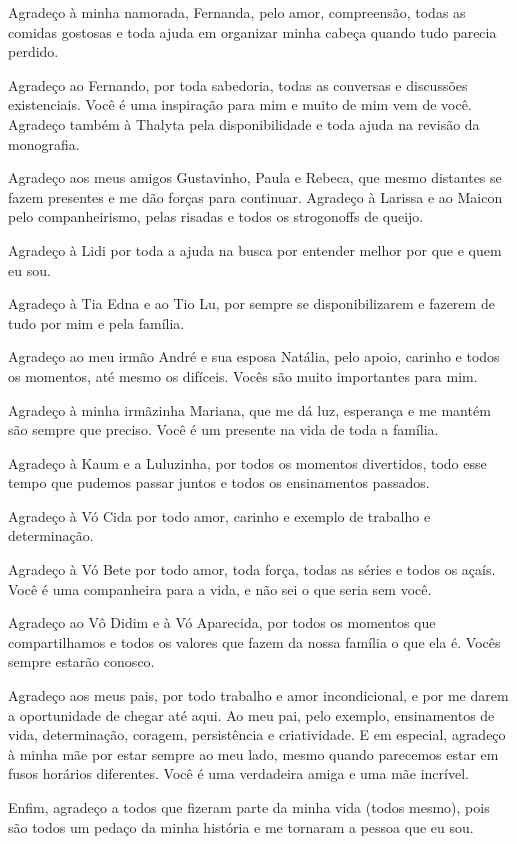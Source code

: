\documentclass[12pt,a4paper]{report}
\begin{document}
Agradeço à minha namorada, Fernanda, pelo amor, compreensão, todas as comidas gostosas e toda ajuda em organizar
minha cabeça quando tudo parecia perdido.

Agradeço ao Fernando, por toda sabedoria, todas as conversas e discussões existenciais. Você é uma inspiração
para mim e muito de mim vem de você. Agradeço também à Thalyta pela disponibilidade e toda ajuda na revisão da
monografia.

Agradeço aos meus amigos Gustavinho, Paula e Rebeca, que mesmo distantes se fazem presentes e me dão forças
para continuar. Agradeço à Larissa e ao Maicon pelo companheirismo, pelas risadas e todos os strogonoffs de
queijo.

Agradeço à Lidi por toda a ajuda na busca por entender melhor por que e quem eu sou.

Agradeço à Tia Edna e ao Tio Lu, por sempre se disponibilizarem e fazerem de tudo por mim e pela família.

Agradeço ao meu irmão André e sua esposa Natália, pelo apoio, carinho e todos os momentos, até mesmo os
difíceis. Vocês são muito importantes para mim.

Agradeço à minha irmãzinha Mariana, que me dá luz, esperança e me mantém são sempre que preciso. Você é um
presente na vida de toda a família.

Agradeço à Kaum e a Luluzinha, por todos os momentos divertidos, todo esse tempo que pudemos passar juntos
e todos os ensinamentos passados.

Agradeço à Vó Cida por todo amor, carinho e exemplo de trabalho e determinação.

Agradeço à Vó Bete por todo amor, toda força, todas as séries e todos os açaís. Você é uma companheira para a
vida, e não sei o que seria sem você.

Agradeço ao Vô Didim e à Vó Aparecida, por todos os momentos que compartilhamos e todos os valores que fazem
da nossa família o que ela é. Vocês sempre estarão conosco.

Agradeço aos meus pais, por todo trabalho e amor incondicional, e por me darem a oportunidade de chegar até
aqui. Ao meu pai, pelo exemplo, ensinamentos de vida, determinação, coragem, persistência e criatividade. E em
especial, agradeço à minha mãe por estar sempre ao meu lado, mesmo quando parecemos estar em fusos horários
diferentes. Você é uma verdadeira amiga e uma mãe incrível.

Enfim, agradeço a todos que fizeram parte da minha vida (todos mesmo), pois são todos um pedaço da minha
história e me tornaram a pessoa que eu sou.
\end{document}

